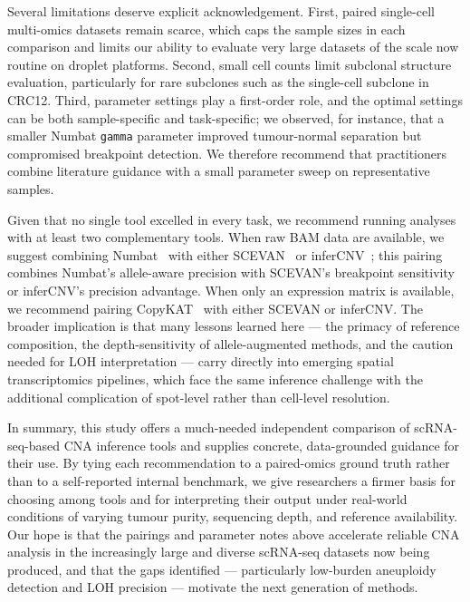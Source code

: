 \documentclass[11pt]{article}
\begin{document}
Several limitations deserve explicit acknowledgement. First, paired
single-cell multi-omics datasets remain scarce, which caps the sample sizes
in each comparison and limits our ability to evaluate very large datasets
of the scale now routine on droplet platforms. Second, small cell counts
limit subclonal structure evaluation, particularly for rare subclones such
as the single-cell subclone in CRC12. Third, parameter settings play a
first-order role, and the optimal settings can be both sample-specific and
task-specific; we observed, for instance, that a smaller Numbat
\texttt{gamma} parameter improved tumour-normal separation but compromised
breakpoint detection. We therefore recommend that practitioners combine
literature guidance with a small parameter sweep on representative samples.

Given that no single tool excelled in every task, we recommend running
analyses with at least two complementary tools. When raw BAM data are
available, we suggest combining Numbat~\cite{gao2023numbat} with either
SCEVAN~\cite{defalco2023scevan} or inferCNV~\cite{tickle2019infercnv};
this pairing combines Numbat's allele-aware precision with SCEVAN's
breakpoint sensitivity or inferCNV's precision advantage. When only an
expression matrix is available, we recommend pairing
CopyKAT~\cite{gao2021copykat} with either SCEVAN or inferCNV. The broader
implication is that many lessons learned here --- the primacy of reference
composition, the depth-sensitivity of allele-augmented methods, and the
caution needed for LOH interpretation --- carry directly into emerging
spatial transcriptomics pipelines, which face the same inference challenge
with the additional complication of spot-level rather than cell-level
resolution.

In summary, this study offers a much-needed independent comparison of
scRNA-seq-based CNA inference tools and supplies concrete, data-grounded
guidance for their use. By tying each recommendation to a paired-omics
ground truth rather than to a self-reported internal benchmark, we give
researchers a firmer basis for choosing among tools and for interpreting
their output under real-world conditions of varying tumour purity,
sequencing depth, and reference availability. Our hope is that the pairings
and parameter notes above accelerate reliable CNA analysis in the
increasingly large and diverse scRNA-seq datasets now being produced, and
that the gaps identified --- particularly low-burden aneuploidy detection
and LOH precision --- motivate the next generation of methods.


\end{document}
